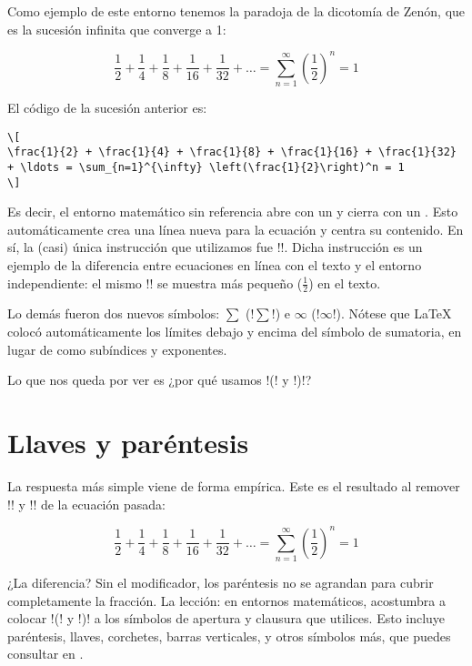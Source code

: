 Como ejemplo de este entorno tenemos la paradoja de la dicotomía de Zenón, que es la sucesión infinita que converge a 1:

\[
\frac{1}{2} + \frac{1}{4} + \frac{1}{8} + \frac{1}{16} + \frac{1}{32} + \ldots = \sum_{n=1}^{\infty} \left(\frac{1}{2}\right)^n = 1
\]

El código de la sucesión anterior es:

\begin{lstlisting}[style=latex,numbers=none,mathescape=false]
\[
\frac{1}{2} + \frac{1}{4} + \frac{1}{8} + \frac{1}{16} + \frac{1}{32} + \ldots = \sum_{n=1}^{\infty} \left(\frac{1}{2}\right)^n = 1
\]
\end{lstlisting}

Es decir, el entorno matemático sin referencia abre con un \codigo{[} y cierra con un \codigo{]}. Esto automáticamente crea una línea nueva para la ecuación y centra su contenido. En sí, la (casi) única instrucción que utilizamos fue !!. Dicha instrucción es un ejemplo de la diferencia entre ecuaciones en línea con el texto y el entorno independiente: el mismo !! se muestra más pequeño ($\frac{1}{2}$) en el texto.

Lo demás fueron dos nuevos símbolos: $\sum$ (!$\sum$!) e $\infty$ (!$\infty$!). Nótese que \LaTeX{} colocó automáticamente los límites debajo y encima del símbolo de sumatoria, en lugar de como subíndices y exponentes.

Lo que nos queda por ver es ¿por qué usamos !\left(! y !\right)!?



\section{Llaves y paréntesis}
\label{sec:llaves_y_parentesis}



La respuesta más simple viene de forma empírica. Este es el resultado al remover !\left! y !\right! de la ecuación pasada:

\[
\frac{1}{2} + \frac{1}{4} + \frac{1}{8} + \frac{1}{16} + \frac{1}{32} + \ldots = \sum_{n=1}^{\infty} (\frac{1}{2})^n = 1
\]

¿La diferencia? Sin el modificador, los paréntesis no se agrandan para cubrir completamente la fracción. La lección: en entornos matemáticos, acostumbra a colocar !\left(! y !\right)! a los símbolos de apertura y clausura que utilices. Esto incluye paréntesis, llaves, corchetes, barras verticales, y otros símbolos más, que puedes consultar en \cite{bib:math_brackets}.

